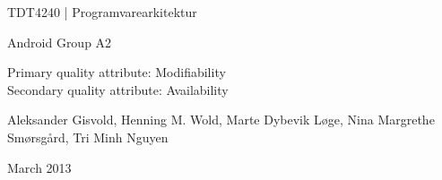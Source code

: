 \begin{titlepage}
\begin{center}
\vspace*{1in}
{\LARGE TDT4240 | Programvarearkitektur}
\par
\vspace{1in}
{\LARGE Android Group A2}
\par
\vspace{1in}
{\LARGE Primary quality attribute: Modifiability\\Secondary quality attribute:
Availability} %
\par
\vfill
\par
\vspace{0.5in}
Aleksander Gisvold, Henning M. Wold, Marte Dybevik Løge, Nina Margrethe
Smørsgård, Tri Minh Nguyen
\par
March 2013 %
\end{center}
\end{titlepage}
